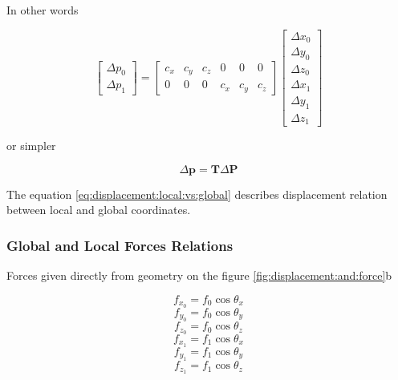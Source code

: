 In other words

\begin{equation}
\begin{bmatrix}
	\Delta p_0 \\
	\Delta p_1
\end{bmatrix}
=
\begin{bmatrix}
	c_x & c_y & c_z & 0 & 0 & 0 \\
	0 & 0 & 0 & c_x & c_y & c_z
\end{bmatrix}
\begin{bmatrix}
	\Delta x_0 \\
	\Delta y_0 \\
	\Delta z_0 \\
	\Delta x_1 \\
	\Delta y_1 \\
	\Delta z_1
\end{bmatrix}
\end{equation}

or simpler

\begin{equation}
\Delta \mathbf{p} = \mathbf{T} \Delta \mathbf{P}
\label{eq:displacement:local:vs:global}
\end{equation}

The equation \ref{eq:displacement:local:vs:global} describes displacement relation between local and global coordinates.

\subsubsection{Global and Local Forces Relations}

Forces given directly from geometry on the figure \ref{fig:displacement:and:force}b

\begin{equation}
f_{x_0} = f_0 \cos \theta_x
\end{equation}
\begin{equation}
f_{y_0} = f_0 \cos \theta_y
\end{equation}
\begin{equation}
f_{z_0} = f_0 \cos \theta_z
\end{equation}
\begin{equation}
f_{x_1} = f_1 \cos \theta_x
\end{equation}
\begin{equation}
f_{y_1} = f_1 \cos \theta_y
\end{equation}
\begin{equation}
f_{z_1} = f_1 \cos \theta_z
\end{equation}

